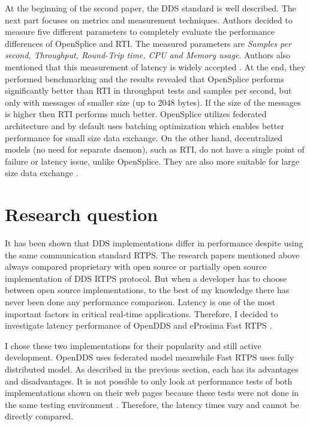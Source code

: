 \documentclass{csfourzero}
\begin{document}
At the beginning of the second paper, the DDS standard is well described. The next part focuses on metrics and measurement techniques. Authors decided to measure five different parameters to completely evaluate the performance differences of OpenSplice and RTI. The measured parameters are \textit{Samples per second, Throughput, Round-Trip time, CPU and Memory usage}. Authors also mentioned that this measurement of latency is widely accepted \cite{perf-embedded}. At the end, they performed benchmarking and the results revealed that OpenSplice performs significantly better than RTI in throughput tests and samples per second, but only with messages of smaller size (up to 2048 bytes). If the size of the messages is higher then RTI performs much better. OpenSplice utilizes federated architecture \cite{federated-arch} and by default uses batching optimization which enables better performance for small size data exchange. On the other hand, decentralized models (no need for separate daemon), such as RTI, do not have a single point of failure or latency issue, unlike OpenSplice. They are also more suitable for large size data exchange \cite{splice-vs-rti}.

\section{Research question}
\label{sec:rq}

\quad It has been shown that DDS implementations differ in performance despite using the same communication standard RTPS. The research papers mentioned above always compared proprietary with open source or partially open source implementation of DDS RTPS protocol. But when a developer has to choose between open source implementations, to the best of my knowledge there has never been done any performance comparison. Latency is one of the most important factors in critical real-time applications. Therefore, I decided to investigate latency performance of OpenDDS \cite{git-openDDS} and eProsima Fast RTPS \cite{git-eProsima}. 

I chose these two implementations for their popularity and still active development. OpenDDS uses federated model meanwhile Fast RTPS uses fully distributed model. As described in the previous section, each has its advantages and disadvantages. It is not possible to only look at performance tests of both implementations shown on their web pages because these tests were not done in the same testing environment \cite{eProsima-perf, openDDS-perf}. Therefore, the latency times vary and cannot be directly compared.
\end{document}
